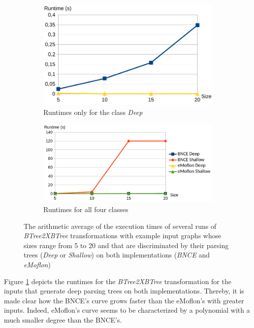 \begin{figure}
	\begin{subfigure}[t]{0.44\textwidth}
		\centering
		\includegraphics[width=\textwidth]{figures/performance/btree2xbtree-deep}
		\caption{Runtimes only for the class \emph{Deep}}
		\label{fig:performance-btree2xbtree-deep}
	\end{subfigure}
	\begin{subfigure}[t]{0.55\textwidth}
		\centering
		\includegraphics[width=\textwidth]{figures/performance/btree2xbtree}
		\caption{Runtimes for all four classes}
		\label{fig:performance-btree2xbtree}
	\end{subfigure}
	\caption{The arithmetic average of the execution times of several runs of \emph{BTree2XBTree} transformations with example input graphs whose sizes range from 5 to 20 and that are discriminated by their parsing trees (\emph{Deep} or \emph{Shallow}) on both implementations (\emph{BNCE} and \emph{eMoflon})}
\end{figure}

Figure \ref{fig:performance-btree2xbtree-deep} depicts the runtimes for the \emph{BTree2XBTree} transformation for the inputs that generate deep parsing trees on both implementations. Thereby, it is made clear how the BNCE's curve grows faster than the eMoflon's with greater inputs. Indeed, eMoflon's curve seems to be characterized by a polynomial with a much smaller degree than the BNCE's.

